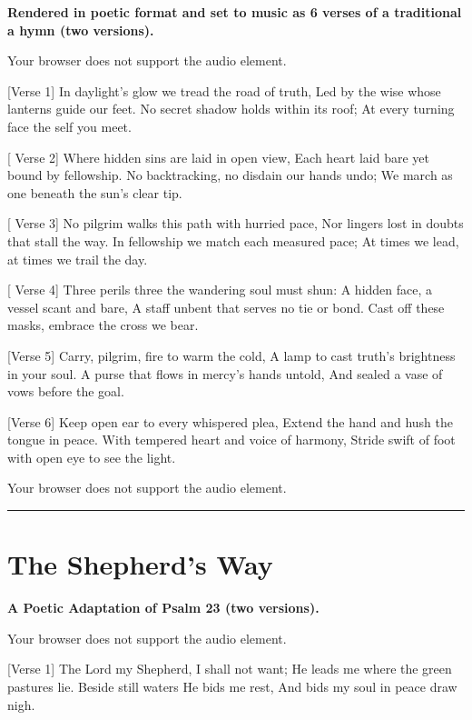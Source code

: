 \documentclass[
]{book}
\begin{document}
\textbf{Rendered in poetic format and set to music as 6 verses of a traditional a hymn (two versions).}

Your browser does not support the audio element.

{[}Verse 1{]}
In daylight's glow we tread the road of truth,
Led by the wise whose lanterns guide our feet.
No secret shadow holds within its roof;
At every turning face the self you meet.

{[} Verse 2{]}
Where hidden sins are laid in open view,
Each heart laid bare yet bound by fellowship.
No backtracking, no disdain our hands undo;
We march as one beneath the sun's clear tip.

{[} Verse 3{]}
No pilgrim walks this path with hurried pace,
Nor lingers lost in doubts that stall the way.
In fellowship we match each measured pace;
At times we lead, at times we trail the day.

{[} Verse 4{]}
Three perils three the wandering soul must shun:
A hidden face, a vessel scant and bare,
A staff unbent that serves no tie or bond.
Cast off these masks, embrace the cross we bear.

{[}Verse 5{]}
Carry, pilgrim, fire to warm the cold,
A lamp to cast truth's brightness in your soul.
A purse that flows in mercy's hands untold,
And sealed a vase of vows before the goal.

{[}Verse 6{]}
Keep open ear to every whispered plea,
Extend the hand and hush the tongue in peace.
With tempered heart and voice of harmony,
Stride swift of foot with open eye to see the light.

Your browser does not support the audio element.

\begin{center}\rule{0.5\linewidth}{0.5pt}\end{center}

\hypertarget{the-shepherds-way}{%
\section*{The Shepherd's Way}\label{the-shepherds-way}}

\textbf{A Poetic Adaptation of Psalm 23 (two versions).}

Your browser does not support the audio element.

{[}Verse 1{]}
The Lord my Shepherd, I shall not want;
He leads me where the green pastures lie.
Beside still waters He bids me rest,
And bids my soul in peace draw nigh.
\end{document}
